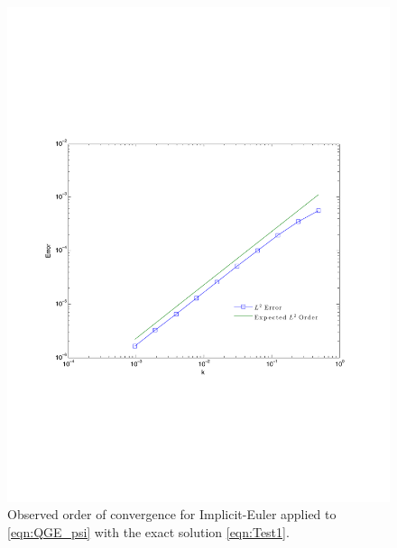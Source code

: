 \begin{figure}
  \begin{center}
    \includegraphics[scale=0.6]{Figures/sin2sin2sinTimeConvergence.pdf}
    \caption{Observed order of convergence for Implicit-Euler applied to
      \eqref{eqn:QGE_psi} with the exact solution \eqref{eqn:Test1}.}
  \label{fig:Test1Time}
  \end{center}
\end{figure}

